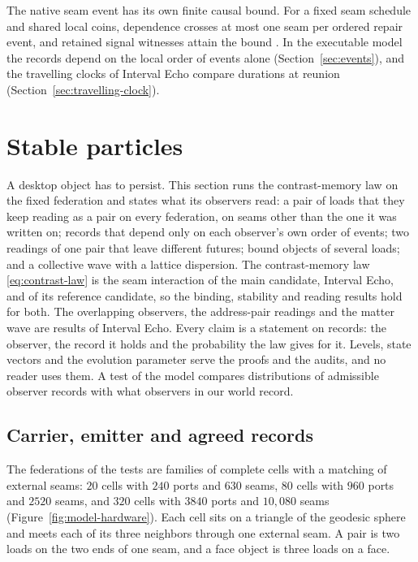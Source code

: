\documentclass[11pt]{article}
\theoremstyle{definition}
\theoremstyle{remark}
\begin{document}
The native seam event has its own finite causal bound. For a fixed seam
schedule and shared local coins, dependence crosses at most one seam per
ordered repair event, and retained signal witnesses attain the bound
\cite{ophcausality}. In the executable model the records depend on the
local order of events alone (Section~\ref{sec:events}), and the travelling
clocks of Interval Echo compare durations at reunion
(Section~\ref{sec:travelling-clock}).

\section{Stable particles}
\label{sec:observer-runs}

A desktop object has to persist. This section runs the contrast-memory
law on the fixed federation and states what its observers read: a pair
of loads that they keep reading as a pair on every federation, on seams
other than the one it was written on; records that depend only on each
observer's own order of events; two readings of one pair that leave
different futures; bound objects of several loads; and a collective wave
with a lattice dispersion. The contrast-memory law \eqref{eq:contrast-law} is
the seam interaction of the main candidate, Interval Echo, and of its
reference candidate, so the binding, stability and reading results hold
for both. The overlapping observers, the address-pair readings and the
matter wave are results of Interval Echo. Every claim is a
statement on records: the observer, the record it holds and the
probability the law gives for it. Levels, state vectors and the
evolution parameter serve the proofs and the audits, and no reader uses
them. A test of the model compares distributions of admissible observer
records with what observers in our world record.

\subsection{Carrier, emitter and agreed records}
\label{sec:measurement-process}

The federations of the tests are families of complete cells with a
matching of external seams: $20$ cells with $240$ ports and $630$ seams,
$80$ cells with $960$ ports and $2520$ seams, and $320$ cells with $3840$
ports and $10{,}080$ seams (Figure~\ref{fig:model-hardware}). Each cell sits
on a triangle of the geodesic sphere and meets each of its three neighbors
through one external seam. A pair is two loads on the two ends of one seam,
and a face object is three loads on a face.
\end{document}
